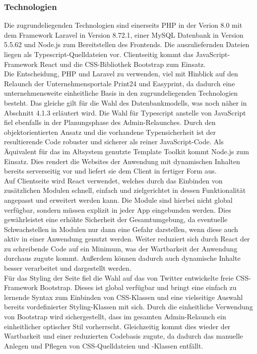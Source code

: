     \subsubsection{Technologien}
        Die zugrundeliegenden Technologien sind einerseits PHP in der Verion 8.0 mit dem Framework \glqq Laravel\grqq{} in Version 8.72.1, einer MySQL Datenbank in Version 5.5.62 und Node.js zum Bereitstellen des Frontends. Die auszuliefernden Dateien liegen als Typescript-Quelldateien vor. Clientseitig kommt das JavaScript-Framework \glqq React\grqq{} und die CSS-Bibliothek \glqq Bootstrap\grqq{} zum Einsatz.\\
        Die Entscheidung, PHP und Laravel zu verwenden, viel mit Hinblick auf den Relaunch der Unternehmensportale \glqq Print24\grqq{} und \glqq Easyprint\grqq{}, da dadurch eine unternehmensweite einheitliche Basis in den zugrundeliegenden Technologien besteht. Das gleiche gilt für die Wahl des Datenbankmodells, was noch näher in Abschnitt 4.1.3 erläutert wird. Die Wahl für Typescript anstelle von JavaScript fiel ebenfalls in der Planungsphase des Admin-Relaunches. Durch den objektorientierten Ansatz und die vorhandene Typensicherheit ist der resultierende Code robuster und sicherer als reiner JavaScript-Code. Als Äquivalent für das im Altsystem genutzte Template Toolkit kommt Node.js zum Einsatz. Dies rendert die Websites der Anwendung mit dynamischen Inhalten bereits serverseitig vor und liefert sie dem Client in fertiger Form aus.\\
        Auf Clientseite wird React verwendet, welches durch das Einbinden von zusätzlichen Modulen schnell, einfach und zielgerichtet in dessen Funktionalität angepasst und erweitert werden kann. Die Module sind hierbei nicht global verfügbar, sondern müssen explizit in jeder App eingebunden werden. Dies gewährleistet eine erhöhte Sicherheit der Gesamtumgebung, da eventuelle Schwachstellen in Modulen nur dann eine Gefahr darstellen, wenn diese auch aktiv in einer Anwendung genutzt werden. Weiter reduziert sich durch React der zu schreibende \mbox{Code} auf ein Minimum, was der Wartbarkeit der Anwendung durchaus zugute kommt. Außerdem können dadurch auch dynamische Inhalte besser verarbeitet und dargestellt werden.\\
        Für das Styling der Seite fiel die Wahl auf das von Twitter entwickelte freie CSS-Framework Bootstrap. Dieses ist global verfügbar und bringt eine einfach zu lernende Syntax zum Einbinden von CSS-Klassen und eine vielseitige Auswahl bereits vordefinierter Styling-Klassen mit sich. Durch die einheitliche Verwendung von Bootstrap wird sichergestellt, dass im gesamten Admin-Relaunch ein einheitlicher optischer Stil vorherrscht. Gleichzeitig kommt dies wieder der Wartbarkeit und einer reduzierten Codebasis zugute, da dadurch das manuelle Anlegen und Pflegen von CSS-Quelldateien und -Klassen entfällt.

